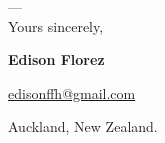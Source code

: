 \vfill
\begin{minipage}[c]{.75\textwidth}
    ---\\
    Yours sincerely,

    \vspace*{6mm}

    \textbf{Edison Florez}

    \href{mailto:edisonffh@gmail.com}{edisonffh@gmail.com}


    Auckland, New Zealand.
\end{minipage}
